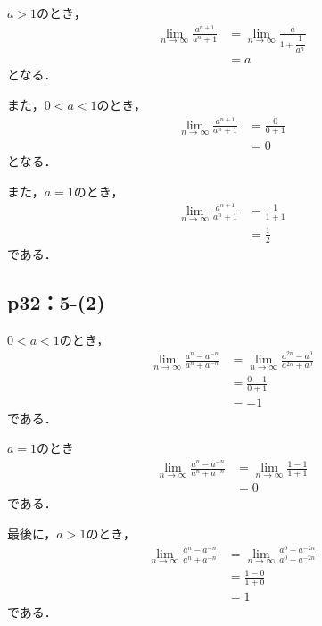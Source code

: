 \documentclass[uplatex,dvipdfmx,a4paper,10pt,fleqn]{jsarticle}
\begin{document}
\begin{tleftbar}
    $a>1$のとき，
    \begin{align*} 
        \lim_{n \to \infty} \frac{a^{n+1}}{a^n +1} & = \lim_{n \to \infty} \frac{a}{1+\dfrac{1}{a^n}} \\
        & = a 
    \end{align*} 
    となる．
    
    また，$0<a<1$のとき，
    \begin{align*} 
        \lim_{n \to \infty} \frac{a^{n+1}}{a^n +1} & = \frac{0}{0+1} \\
        & =0 
    \end{align*} 
    となる．

    また，$a=1$のとき，
    \begin{align*}
    \lim_{n \to \infty} \frac{a^{n+1}}{a^n +1} & = \frac{1}{1+1} \\
    & =\frac{1}{2}
    \end{align*}
    である．
\end{tleftbar}

\subsection*{p32：5-(2)}

\begin{tleftbar} 
    $ 0 < a <1 $のとき，
    \begin{align*} 
        \lim_{n \to \infty} \frac{a^n - a^{-n}}{a^n + a^{-n}} & =\lim_{n \to \infty} \frac{a^{2n} - a^{0}}{a^{2n} + a^{0}} \\
        & = \frac{0-1}{0+1} \\
        & = -1 
    \end{align*} 
    である．

    $a=1$のとき
    \begin{align*}
    \lim_{n \to \infty} \frac{a^n - a^{-n}}{a^n + a^{-n}} & =  \lim_{n \to \infty} \frac{1-1}{1+1} \\
    & = 0
    \end{align*} 
    である．

    最後に，$a>1$のとき，
    \begin{align*} 
    \lim_{n \to \infty} \frac{a^n - a^{-n}}{a^n + a^{-n}} & =  \lim_{n \to \infty} \frac{a^0 - a^{-2n}}{a^0 + a^{-2n}} \\
    & = \frac{1-0}{1+0} \\
    & = 1 
    \end{align*}
    である．
\end{tleftbar}
\end{document}
